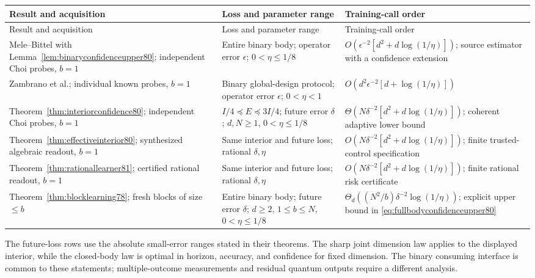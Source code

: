 \begingroup
\small
\setlength{\tabcolsep}{4pt}
\renewcommand{\arraystretch}{1.17}
\begin{longtable}{@{}>{\raggedright\arraybackslash}p{}>{\raggedright\arraybackslash}p{}>{\raggedright\arraybackslash}p{}@{}}
\toprule
Result and acquisition & Loss and parameter range & Training-call order\\
\midrule
\endfirsthead
\toprule
Result and acquisition & Loss and parameter range & Training-call order\\
\midrule
\endhead
Mele--Bittel with Lemma~\ref{lem:binaryconfidenceupper80};
independent Choi probes, $b=1$ &
Entire binary body; operator error $\epsilon$;
$0<\eta\le1/8$ &
$O(\epsilon^{-2}[d^2+d\log(1/\eta)])$;
source estimator with a confidence extension\\
Zambrano et al.; individual known probes, $b=1$ &
Binary global-design protocol; operator error $\epsilon$;
$0<\eta<1$ &
$O(d^2\epsilon^{-2}[d+\log(1/\eta)])$\\
Theorem~\ref{thm:interiorconfidence80}; independent Choi probes,
$b=1$ &
$I/4\preceq E\preceq3I/4$; future error $\delta$;
$d,N\ge1$, $0<\eta\le1/8$ &
$\Theta(N\delta^{-2}[d^2+d\log(1/\eta)])$;
coherent adaptive lower bound\\
Theorem~\ref{thm:effectiveinterior80}; synthesized algebraic
readout, $b=1$ &
Same interior and future loss; rational $\delta,\eta$ &
$O(N\delta^{-2}[d^2+d\log(1/\eta)])$;
finite trusted-control specification\\
Theorem~\ref{thm:rationallearner81}; certified rational readout,
$b=1$ &
Same interior and future loss; rational $\delta,\eta$ &
$O(N\delta^{-2}[d^2+d\log(1/\eta)])$;
finite rational risk certificate\\
Theorem~\ref{thm:blocklearning78}; fresh blocks of size $\le b$ &
Entire binary body; future error $\delta$;
$d\ge2$, $1\le b\le N$, $0<\eta\le1/8$ &
$\Theta_d((N^2/b)\delta^{-2}\log(1/\eta))$;
explicit upper bound in
\eqref{eq:fullbodyconfidenceupper80}\\
\bottomrule
\end{longtable}
\endgroup
The future-loss rows use the absolute small-error ranges stated in
their theorems.  The sharp joint dimension law applies to the
displayed interior, while the closed-body law is optimal in
horizon, accuracy, and confidence for fixed dimension.  The binary
consuming interface is common to these statements; multiple-outcome
measurements and residual quantum outputs require a different
analysis.

